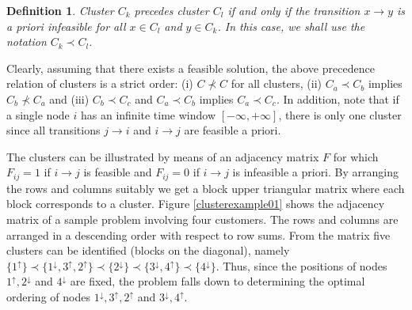 \documentclass[dissertation,draft*]{aaltoseries}
\newtheorem*{definition}{Definition}
\begin{document}
\begin{definition}
Cluster $C_k$ precedes cluster $C_l$ 
if and only if the transition $x \to y$ is a priori infeasible for all $x \in C_l$ and
$y \in C_k$. In this case, we shall use the notation $C_k \prec C_l$.
\end{definition}

Clearly, assuming that there exists a feasible solution, the above precedence relation 
of clusters is a strict order: (i) $C \not\prec C$ for all clusters, (ii) $C_a \prec C_b$
implies $C_b \not\prec C_a$ and (iii) $C_b \prec C_c$ and $C_a \prec C_b$ implies
$C_a \prec C_c$. In addition, note that if a single node $i$ has an infinite time window $[-\infty,+\infty]$, there is 
only one cluster since all transitions $j \to i$
and $i \to j$ are feasible a priori.

The clusters can be illustrated by means of an adjacency matrix $F$ for which $F_{ij}=1$ if $i\to j$ is
feasible and $F_{ij}=0$ if $i\to j$ is infeasible a priori. By arranging the rows and
columns suitably we get a block upper triangular matrix where each block corresponds to
a cluster. Figure \ref{clusterexample01} shows the adjacency matrix of a sample problem
involving four customers. The rows and columns are arranged in a descending order 
with respect to row sums. From the matrix five clusters can be identified (blocks on the diagonal), namely 
$\{1^{\uparrow} \}	\prec \{ 1^{\downarrow}, 3^{\uparrow}, 2^{\uparrow}\} \prec \{ 2^{\downarrow} \} \prec  
\{ 3^{\downarrow}, 4^{\uparrow} \} \prec  \{ 4^{\downarrow} \}$. 
Thus, since the positions of nodes $1^{\uparrow}, 2^{\downarrow}$ and $4^{\downarrow}$ are fixed,
the problem falls down to determining the 
optimal ordering of nodes $1^{\downarrow}, 3^{\uparrow}, 2^{\uparrow}$ and 
$3^{\downarrow}, 4^{\uparrow}$. 
\end{document}
